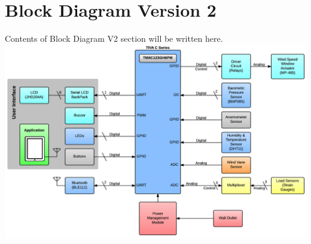 \section{Block Diagram Version 2}
		Contents of Block Diagram V2 section will be written here.\\

		\includegraphics[scale=0.30]{img/blockdiagramv2}


\newpage